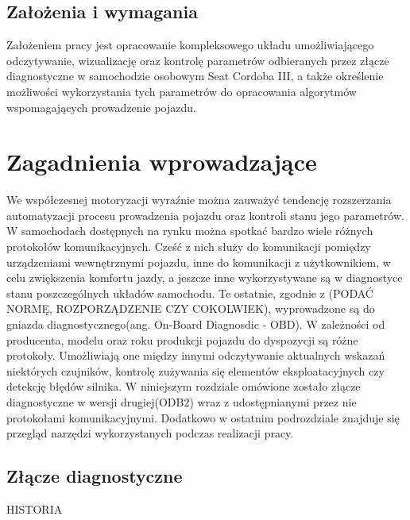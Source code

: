 \documentclass[12pt]{article} %
\numberwithin{equation}{subsection}
\numberwithin{figure}{section}
\numberwithin{table}{section}
\begin{document}
	\subsection{Założenia i wymagania}
		\hspace{0.5cm}Założeniem pracy jest opracowanie kompleksowego układu umożliwiającego odczytywanie, wizualizację oraz kontrolę parametrów odbieranych przez złącze diagnostyczne w samochodzie osobowym Seat Cordoba III, a także określenie możliwości wykorzystania tych parametrów do opracowania algorytmów wspomagających prowadzenie pojazdu.
	
		\newpage

\section{Zagadnienia wprowadzające}
	\hspace{0.5cm}We współczesnej motoryzacji wyraźnie można zauważyć tendencję rozszerzania automatyzacji procesu prowadzenia pojazdu oraz kontroli stanu jego parametrów. W samochodach dostępnych na rynku można spotkać bardzo wiele różnych protokołów komunikacyjnych. Cześć z nich służy do komunikacji pomiędzy urządzeniami wewnętrznymi pojazdu, inne do komunikacji z użytkownikiem, w celu zwiększenia komfortu jazdy, a jeszcze inne wykorzystywane są w diagnostyce stanu poszczególnych układów samochodu. Te ostatnie, zgodnie z (PODAĆ NORMĘ, ROZPORZĄDZENIE CZY COKOLWIEK), wyprowadzone są do gniazda diagnostycznego(ang. On-Board Diagnosdic - OBD). W zależności od producenta, modelu oraz roku produkcji pojazdu do dyspozycji są różne protokoły. Umożliwiają one między innymi odczytywanie aktualnych wskazań niektórych czujników, kontrolę zużywania się elementów eksploatacyjnych czy detekcję błędów silnika. W niniejszym rozdziale omówione zostało złącze diagnostyczne w wersji drugiej(ODB2) wraz z udostępnianymi przez nie protokołami komunikacyjnymi. Dodatkowo w ostatnim podrozdziale znajduje się przegląd narzędzi wykorzystanych podczas realizacji pracy.

	\subsection{Złącze diagnostyczne}
		\hspace{0.5cm} HISTORIA
	
		\newpage	
	
\end{document}
